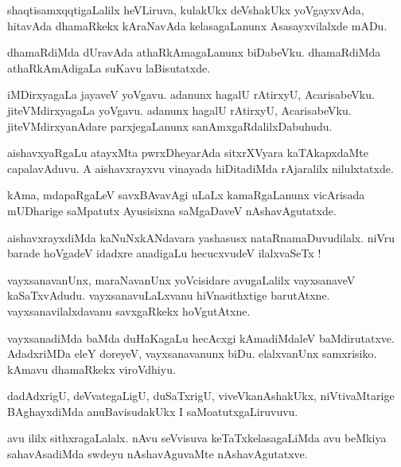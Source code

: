 \documentclass{article}
\begin{document}
\begin{mn}%
shaqtisamxqqtigaLalilx heVLiruva, kulakUkx deVshakUkx yoVgayxvAda, hitavAda dhamaRkekx 
kAraNavAda kelasagaLanunx Asasayxvilalxde mADu.
\end{mn}

\begin{mn}%
dhamaRdiMda dUravAda athaRkAmagaLanunx biDabeVku. dhamaRdiMda athaRkAmAdigaLa suKavu 
laBisutatxde.
\end{mn}

\begin{mn}%
iMDirxyagaLa jayaveV yoVgavu. adanunx hagalU rAtirxyU, AcarisabeVku. jiteVMdirxyagaLa 
yoVgavu. adanunx hagalU rAtirxyU, AcarisabeVku. jiteVMdirxyanAdare parxjegaLanunx 
sanAmxgaRdalilxDabuhudu.
\end{mn}

\begin{mn}%
aishavxyaRgaLu atayxMta pwrxDheyarAda sitxrXVyara  kaTAkapxdaMte capalavAduvu. A 
aishavxrayxvu vinayada hiDitadiMda rAjaralilx nilulxtatxde.
\end{mn}

\begin{mn}%
kAma, mdapaRgaLeV savxBAvavAgi uLaLx kamaRgaLanunx vicArisada mUDharige saMpatutx 
Ayusisixna saMgaDaveV nAshavAgutatxde.
\end{mn}

\begin{mn}%
aishavxrayxdiMda kaNuNxkANdavara yashasusx nataRnamaDuvudilalx. niVru barade hoVgadeV 
idadxre anadigaLu hecucxvudeV ilalxvaSeTx !
\end{mn}

\begin{mn}%
vayxsanavanUnx, maraNavanUnx yoVcisidare avugaLalilx vayxsanaveV kaSaTxvAdudu. 
vayxsanavuLaLxvanu hiVnasithxtige barutAtxne. vayxsanavilalxdavanu savxgaRkekx hoVgutAtxne.
\end{mn}

\begin{mn}%
vayxsanadiMda baMda duHaKagaLu hecAcxgi kAmadiMdaleV baMdirutatxve. AdadxriMDa eleY 
doreyeV, vayxsanavanunx biDu. elalxvanUnx samxrisiko. kAmavu dhamaRkekx viroVdhiyu.
\end{mn}

\begin{mn}%
dadAdxrigU, deVvategaLigU, duSaTxrigU, viveVkanAshakUkx, niVtivaMtarige BAghayxdiMda 
anuBavisudakUkx I saMoatutxgaLiruvuvu.
\end{mn}

\begin{mn}%
avu ililx sithxragaLalalx. nAvu seVvisuva keTaTxkelasagaLiMda avu beMkiya sahavAsadiMda 
swdeyu nAshavAguvaMte nAshavAgutatxve.
\end{mn}
\end{document}
